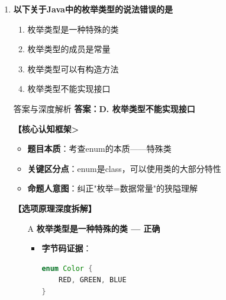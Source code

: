 \documentclass[12pt, a4paper]{ctexart}
\begin{document}
\begin{enumerate}[label=\textbf{\arabic*.}]
\begin{bluebox}{答案与深度解析}
		      \textbf{【应背诵知识点>}
		      \begin{itemize}[label={}, nosep]
			      \item parseXxx(String) → 返回基本类型
			      \item valueOf(String) → 返回包装类对象
			      \item 所有包装类（除Boolean外）都有 parseXxx 方法
		      \end{itemize}

		      \textbf{【命题趋势与实战策略】}

		      \textbf{考场秒杀}：字符串转基本类型→parseXxx()
		      \textbf{对仗记忆}：parseInt/parseDouble/parseLong模式一致
	      \end{bluebox}

	      \vspace{1em}

	\item \textbf{以下关于Java中的枚举类型的说法错误的是}
	      \begin{enumerate}[label=\Alph*.]
		      \item 枚举类型是一种特殊的类
		      \item 枚举类型的成员是常量
		      \item 枚举类型可以有构造方法
		      \item 枚举类型不能实现接口
	      \end{enumerate}

	      \begin{bluebox}{答案与深度解析}
		      \textbf{答案：D. 枚举类型不能实现接口}

		      \textbf{【核心认知框架>}
		      \begin{itemize}[label={}, leftmargin=*, nosep]
			      \item \textbf{题目本质}：考查enum的本质——特殊类
			      \item \textbf{关键区分点}：enum是class，可以使用类的大部分特性
			      \item \textbf{命题人意图}：纠正"枚举=数据常量"的狭隘理解
		      \end{itemize}

		      \textbf{【选项原理深度拆解】}

		      \begin{itemize}[leftmargin=*, nosep, label={}]
			      \item[A] \textbf{枚举类型是一种特殊的类 — 正确}
			            \begin{itemize}[label={}, leftmargin=*, nosep]
				            \item \textbf{字节码证据}：
				                  \begin{lstlisting}[language=Java]
enum Color {
    RED, GREEN, BLUE
}


\end{lstlisting}
\end{itemize}
\end{itemize}
\end{bluebox}
\end{enumerate}
\end{document}
